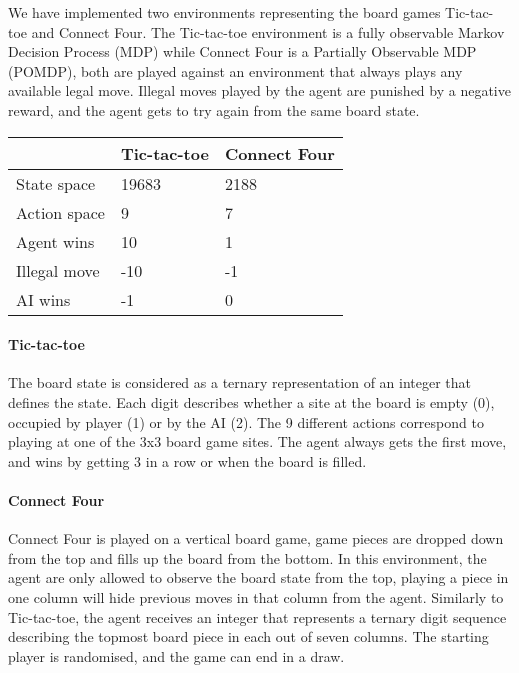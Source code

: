 We have implemented two environments
representing the board games Tic-tac-toe and Connect Four. The Tic-tac-toe
environment is a fully observable Markov Decision Process (MDP) while Connect
Four is a Partially Observable MDP (POMDP), both are played against an
environment that always plays any available legal move. Illegal moves played by
the agent are punished by a negative reward, and the agent gets to try again
from the same board state.

\begin{tabular}{ l | l | l }
                & Tic-tac-toe & Connect Four \\
\hline
  State space 	& 19683 	& 2188 \\
  Action space 	& 9 		& 7 \\
  Agent wins 	& 10 		& 1 \\
  Illegal move 	& -10 	    & -1 \\
  AI wins	 	& -1 		& 0 \\
\end{tabular}

\paragraph{Tic-tac-toe}

The board state is considered as a ternary representation of an integer that
defines the state. Each digit describes whether a site at the board is empty
(0), occupied by player (1) or by the AI (2). The 9 different actions correspond
to playing at one of the 3x3 board game sites. The agent always gets the first
move, and wins by getting 3 in a row or when the board is filled.

\paragraph{Connect Four}

Connect Four is played on a vertical board game, game pieces are dropped down
from the top and fills up the board from the bottom. In this environment, the
agent are only allowed to observe the board state from the top, playing a piece
in one column will hide previous moves in that column from the agent. Similarly
to Tic-tac-toe, the agent receives an integer that represents a ternary digit
sequence describing the topmost board piece in each out of seven columns. The
starting player is randomised, and the game can end in a draw.
